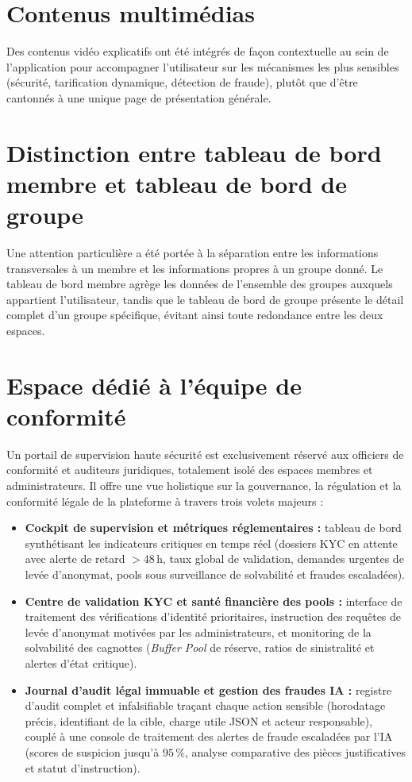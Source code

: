 \documentclass[12pt,a4paper]{report}
\begin{document}
\section{Contenus multimédias}
Des contenus vidéo explicatifs ont été intégrés de façon contextuelle au sein de l'application pour accompagner l'utilisateur sur les mécanismes les plus sensibles (sécurité, tarification dynamique, détection de fraude), plutôt que d'être cantonnés à une unique page de présentation générale.

\section{Distinction entre tableau de bord membre et tableau de bord de groupe}
Une attention particulière a été portée à la séparation entre les informations transversales à un membre et les informations propres à un groupe donné. Le tableau de bord membre agrège les données de l'ensemble des groupes auxquels appartient l'utilisateur, tandis que le tableau de bord de groupe présente le détail complet d'un groupe spécifique, évitant ainsi toute redondance entre les deux espaces.

\section{Espace dédié à l'équipe de conformité}
Un portail de supervision haute sécurité est exclusivement réservé aux officiers de conformité et auditeurs juridiques, totalement isolé des espaces membres et administrateurs. Il offre une vue holistique sur la gouvernance, la régulation et la conformité légale de la plateforme à travers trois volets majeurs :
\begin{itemize}
    \item \textbf{Cockpit de supervision et métriques réglementaires :} tableau de bord synthétisant les indicateurs critiques en temps réel (dossiers KYC en attente avec alerte de retard $>48$\,h, taux global de validation, demandes urgentes de levée d'anonymat, pools sous surveillance de solvabilité et fraudes escaladées).
    \item \textbf{Centre de validation KYC et santé financière des pools :} interface de traitement des vérifications d'identité prioritaires, instruction des requêtes de levée d'anonymat motivées par les administrateurs, et monitoring de la solvabilité des cagnottes (\textit{Buffer Pool} de réserve, ratios de sinistralité et alertes d'état critique).
    \item \textbf{Journal d'audit légal immuable et gestion des fraudes IA :} registre d'audit complet et infalsifiable traçant chaque action sensible (horodatage précis, identifiant de la cible, charge utile JSON et acteur responsable), couplé à une console de traitement des alertes de fraude escaladées par l'IA (scores de suspicion jusqu'à $95\,\%$, analyse comparative des pièces justificatives et statut d'instruction).
\end{itemize}
\end{document}
